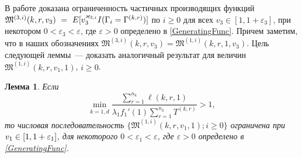 \documentclass[a4paper,twoside]{article}
\theoremstyle{theorem}
\newtheorem{lemma}{Лемма}
\theoremstyle{remark}
\renewcommand*{\hm}[1]{#1\nobreak\discretionary{}%
	{\hbox{$\mathsurround=0pt #1$}}{}}%
\begin{document}
В работе \cite{Kocheganov:2017:1} доказана ограниченность частичных производящих функций $\mathfrak{M}^{(3,i)}(k,r,v_3)~\hm= ~E[v_3^{\varkappa_{3,i}}{I(\Gamma_{i}=\Gamma^{(k,r)})}]$ по $i\geqslant 0$ для всех $v_3\in [1,1+\varepsilon_3]$, при некотором $0 < \varepsilon_3 < \varepsilon$, где $\varepsilon>0$ определено в \eqref{GeneratingFunc}. Причем заметим, что в наших обозначениях $\mathfrak{M}^{(3,i)}(k,r,v_3) =\mathfrak{M}^{(1,i)}(k,r,1,v_3) $. Цель следующей леммы~--- доказать аналогичный результат для величин $\mathfrak{M}^{(1,i)}(k,r,v_1,1)$, $i\geqslant 0$.
\begin{lemma}
Если 
$$
\min_{k=\overline{1,d}} { \frac{\sum_{r = 1}^{n_k} \ell(k,r,1) }{\lambda_1 f_1'(1) \sum_{r=1}^{n_k} T^{(k,r)} }}>1,
$$
то числовая последовательность $\{\mathfrak{M}^{(1,i)}(k,r,v_1,1); i\geqslant 0\}$ ограничена при $v_1 \hm\in [1, 1+\varepsilon_1]$, для некоторого $ 0 < \varepsilon_1 < \varepsilon$, где $\varepsilon>0$ определено в \eqref{GeneratingFunc}.
\label{generating:1:limited}
\end{lemma}
\end{document}
